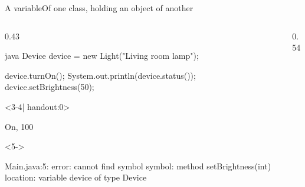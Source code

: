 \documentclass[\deckoptions]{beamer}
\begin{document}
\begin{frame}[fragile]{A  variable}{Of one class, holding an object of another}
  \begin{columns}[c, onlytextwidth]
    \begin{column}{0.43\textwidth}
\begin{codeblock}[steps={1|3|4|5|5|}, compact, marks={1/1, 3/2, 4/3, 5/5/error}, strike={5/5}]{java}
Device device = new Light("Living room lamp");

device.turnOn();
System.out.println(device.status());
device.setBrightness(50);
\end{codeblock}
      \blockgap
      \begin{onlyenv}<3-4| handout:0>
\begin{console}[compact]
On, 100%
\end{console}
      \end{onlyenv}
      \begin{onlyenv}<5->
\begin{consoleerror}[compact]
Main.java:5: error: cannot find symbol
  symbol:   method setBrightness(int)
  location: variable device of type Device
\end{consoleerror}
      \end{onlyenv}
    \end{column}
    \begin{column}{0.54\textwidth}
      \begin{memory}[1]
      \end{memory}
    \end{column}
  \end{columns}
  \notesgap
  \begin{codenotes}[4]
\end{codenotes}
\end{frame}
\end{document}

